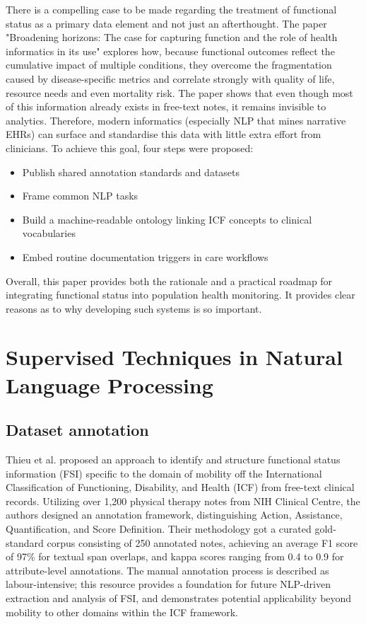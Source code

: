 There is a compelling case to be made regarding the treatment of functional status as a primary data element and not just an afterthought. The paper "Broadening horizons: The case for capturing function and the role of health informatics in its use" \cite{newman-griffis2019bh} explores how, because functional outcomes reflect the cumulative impact of multiple conditions, they overcome the fragmentation caused by disease-specific metrics and correlate strongly with quality of life, resource needs and even mortality risk. The paper shows that even though most of this information already exists in free-text notes, it remains invisible to analytics. Therefore, modern informatics (especially NLP that mines narrative EHRs) can surface and standardise this data with little extra effort from clinicians. To achieve this goal, four steps were proposed:

\begin{itemize}
    \item Publish shared annotation standards and datasets
    \item Frame common NLP tasks
    \item Build a machine-readable ontology linking ICF concepts to clinical vocabularies
    \item Embed routine documentation triggers in care workflows
\end{itemize}

Overall, this paper provides both the rationale and a practical roadmap for integrating functional status into population health monitoring. It provides clear reasons as to why developing such systems is so important.

\section{Supervised Techniques in Natural Language Processing}

\subsection{Dataset annotation}

Thieu et al. \cite{thieu2017} proposed an approach to identify and structure functional status information (FSI) specific to the domain of mobility off the International Classification of Functioning, Disability, and Health (ICF) from free-text clinical records. Utilizing over 1,200 physical therapy notes from NIH Clinical Centre, the authors designed an annotation framework, distinguishing Action, Assistance, Quantification, and Score Definition. Their methodology got a curated gold-standard corpus consisting of 250 annotated notes, achieving an average F1 score of 97\% for textual span overlaps, and kappa scores ranging from 0.4 to 0.9 for attribute-level annotations. The manual annotation process is described as labour-intensive; this resource provides a foundation for future NLP-driven extraction and analysis of FSI, and demonstrates potential applicability beyond mobility to other domains within the ICF framework. \\

